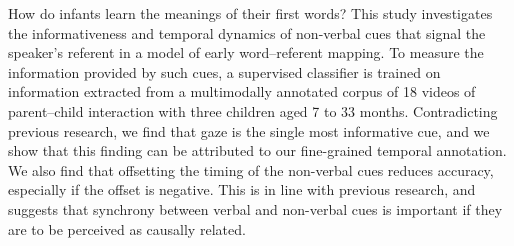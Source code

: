 How do infants learn the meanings of their first words? This study investigates the informativeness and temporal dynamics of non-verbal cues that signal the speaker's referent in a model of early word--referent mapping. To measure the information provided by such cues, a supervised classifier is trained on information extracted from a multimodally annotated corpus of 18 videos of parent--child interaction with three children aged 7 to 33 months. Contradicting previous research, we find that gaze is the single most informative cue, and we show that this finding can be attributed to our fine-grained temporal annotation. We also find that offsetting the timing of the non-verbal cues reduces accuracy, especially if the offset is negative. This is in line with previous research, and suggests that synchrony between verbal and non-verbal cues is important if they are to be perceived as causally related.
